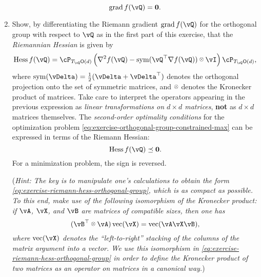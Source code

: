 \documentclass[../../book-main.tex]{subfiles}
\begin{document}
\begin{exercise}
\begin{enumerate}
        \begin{equation*}
            \mathrm{grad}\, f(\vQ) = \mathbf{0}.
        \end{equation*}
        \item Show, by differentiating the Riemann gradient $\mathrm{grad}\, f(\vQ)$ for the orthogonal group with respect to $\vQ$ as in the first part of this exercise, that the \textit{Riemannian Hessian} is given by
        \begin{equation}\label{eq:exercise-riemann-hess-orthogonal-group}
            \mathrm{Hess}\, f(\vQ) = \cP_{T_{\vQ}\O(d)} \left( 
            \nabla^2 f(\vQ) - \Symm(\vQ^\top \nabla f(\vQ)) \kron \vI
            \right) \cP_{T_{\vQ}\O(d)},
        \end{equation}
        where $\Symm(\vDelta) = \tfrac{1}{2}(\vDelta + \vDelta^\top)$ denotes the orthogonal projection onto the set of symmetric matrices, and $\kron$ denotes the Kronecker product of matrices.
        Take care to interpret the operators appearing in the previous expression as \textit{linear transformations on ${d \times d}$ matrices}, \textbf{not} as $d \times d$ matrices themselves.
        The \textit{second-order optimality conditions} for the optimization problem \eqref{eq:exercise-orthogonal-group-constrained-max} can be expressed in terms of the Riemann Hessian:
        \begin{equation*}
            \mathrm{Hess}\, f(\vQ) \preceq \mathbf{0}.
        \end{equation*}
        For a minimization problem, the sign is reversed.

        (\textit{Hint: The key is to manipulate one's calculations to obtain the form \eqref{eq:exercise-riemann-hess-orthogonal-group}, which is as compact as possible. To this end, make use of the following isomorphism of the Kronecker product: if $\vA$, $\vX$, and $\vB$ are matrices of compatible sizes, then one has
        \begin{equation*}
            (\vB^\top \kron \vA) \Vec(\vX) = \Vec(\vA \vX \vB),
        \end{equation*}
        where $\Vec(\vX)$ denotes the ``left-to-right'' stacking of the columns of the matrix argument into a vector. We use this isomorphism in \eqref{eq:exercise-riemann-hess-orthogonal-group} in order to define the Kronecker product of two matrices as an operator on matrices in a canonical way.})
        

\end{enumerate}
\end{exercise}
\end{document}
